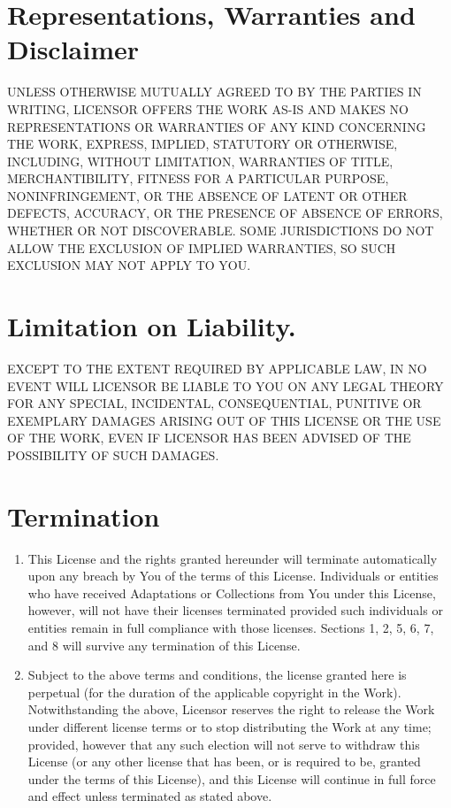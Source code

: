 \begin{enumerate}
\end{enumerate}

\section{Representations, Warranties and Disclaimer}

UNLESS OTHERWISE MUTUALLY AGREED TO BY THE PARTIES IN
WRITING, LICENSOR OFFERS THE WORK AS-IS AND MAKES NO
REPRESENTATIONS OR WARRANTIES OF ANY KIND CONCERNING THE
WORK, EXPRESS, IMPLIED, STATUTORY OR OTHERWISE, INCLUDING,
WITHOUT LIMITATION, WARRANTIES OF TITLE, MERCHANTIBILITY,
FITNESS FOR A PARTICULAR PURPOSE, NONINFRINGEMENT, OR THE
ABSENCE OF LATENT OR OTHER DEFECTS, ACCURACY, OR THE
PRESENCE OF ABSENCE OF ERRORS, WHETHER OR NOT DISCOVERABLE.
SOME JURISDICTIONS DO NOT ALLOW THE EXCLUSION OF IMPLIED
WARRANTIES, SO SUCH EXCLUSION MAY NOT APPLY TO YOU.

\section{Limitation on Liability.} EXCEPT TO
THE EXTENT REQUIRED BY APPLICABLE LAW, IN NO EVENT WILL
LICENSOR BE LIABLE TO YOU ON ANY LEGAL THEORY FOR ANY
SPECIAL, INCIDENTAL, CONSEQUENTIAL, PUNITIVE OR EXEMPLARY
DAMAGES ARISING OUT OF THIS LICENSE OR THE USE OF THE WORK,
EVEN IF LICENSOR HAS BEEN ADVISED OF THE POSSIBILITY OF
SUCH DAMAGES.

\section{Termination}

\begin{enumerate}
\item This License and the rights granted hereunder will
  terminate automatically upon any breach by You of the
  terms of this License. Individuals or entities who have
  received Adaptations or Collections from You under this
  License, however, will not have their licenses terminated
  provided such individuals or entities remain in full
  compliance with those licenses. Sections 1, 2, 5, 6, 7,
  and 8 will survive any termination of this License.

\item Subject to the above terms and conditions, the
  license granted here is perpetual (for the duration of
  the applicable copyright in the Work). Notwithstanding
  the above, Licensor reserves the right to release the
  Work under different license terms or to stop
  distributing the Work at any time; provided, however that
  any such election will not serve to withdraw this License
  (or any other license that has been, or is required to
  be, granted under the terms of this License), and this
  License will continue in full force and effect unless
  terminated as stated above.
\end{enumerate}

